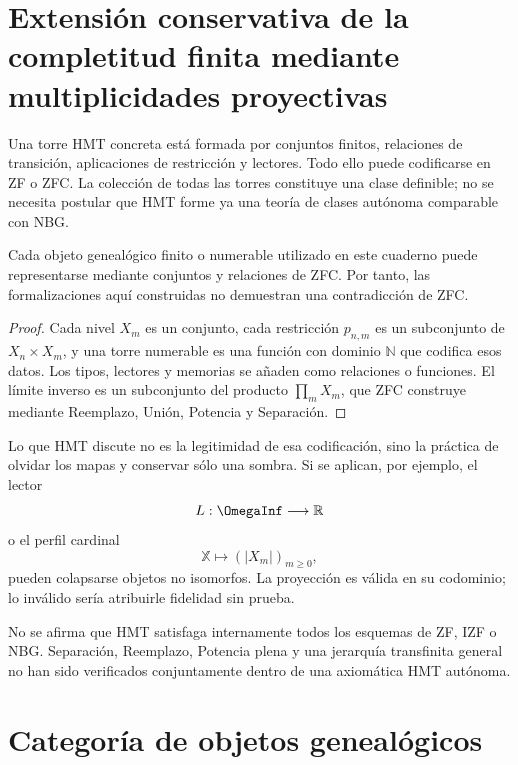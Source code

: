 \label{chap:p3-83-45-completitud_finita}

\section{Extensión conservativa de la completitud finita mediante multiplicidades proyectivas}

Una torre HMT concreta está formada por conjuntos finitos, relaciones de
transición, aplicaciones de restricción y lectores. Todo ello puede
codificarse en ZF o ZFC. La colección de todas las torres constituye una
clase definible; no se necesita postular que HMT forme ya una teoría de
clases autónoma comparable con NBG.

\begin{proposition}
Cada objeto genealógico finito o numerable utilizado en este cuaderno puede
representarse mediante conjuntos y relaciones de ZFC. Por tanto, las
formalizaciones aquí construidas no demuestran una contradicción de ZFC.
\end{proposition}

\begin{proof}
Cada nivel \(X_m\) es un conjunto, cada restricción \(p_{n,m}\) es un
subconjunto de \(X_n\times X_m\), y una torre numerable es una función con
dominio \(\mathbb N\) que codifica esos datos. Los tipos, lectores y memorias
se añaden como relaciones o funciones. El límite inverso es un subconjunto
del producto \(\prod_mX_m\), que ZFC construye mediante Reemplazo, Unión,
Potencia y Separación.
\end{proof}

Lo que HMT discute no es la legitimidad de esa codificación, sino la práctica
de olvidar los mapas y conservar sólo una sombra. Si se aplican, por ejemplo,
el lector
\[
  L:\OmegaInf\longrightarrow\mathbb R
\]
o el perfil cardinal
\[
  \mathbb X\longmapsto(|X_m|)_{m\ge0},
\]
pueden colapsarse objetos no isomorfos. La proyección es válida en su
codominio; lo inválido sería atribuirle fidelidad sin prueba.

\begin{remark}
No se afirma que HMT satisfaga internamente todos los esquemas de ZF, IZF o
NBG. Separación, Reemplazo, Potencia plena y una jerarquía transfinita general
no han sido verificados conjuntamente dentro de una axiomática HMT autónoma.
\end{remark}

\section{Categoría de objetos genealógicos}

